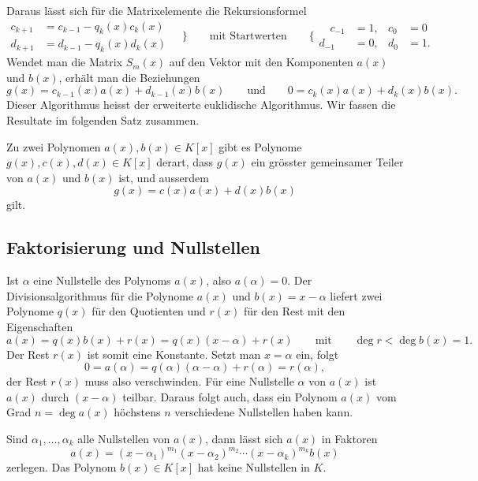 Daraus lässt sich für die Matrixelemente die Rekursionsformel
\[
\begin{aligned}
c_{k+1} &= c_{k-1} - q_k(x) c_k(x) \\
d_{k+1} &= d_{k-1} - q_k(x) d_k(x)
\end{aligned}
\quad
\bigg\}
\qquad
\text{mit Startwerten}
\qquad
\bigg\{
\begin{aligned}
\quad
c_{-1} &= 1, & c_0 &= 0 \\
d_{-1} &= 0, & d_0 &= 1.
\end{aligned}
\]
Wendet man die Matrix $S_m(x)$ auf den Vektor mit den Komponenten
$a(x)$ und $b(x)$, erhält man die Beziehungen
\[
g(x) = c_{k-1}(x) a(x) + d_{k-1}(x) b(x)
\qquad\text{und}\qquad
0 = c_k(x) a(x) + d_k(x) b(x).
\]
Dieser Algorithmus heisst der erweiterte euklidische Algorithmus.
Wir fassen die Resultate im folgenden Satz zusammen.

\begin{satz}
Zu zwei Polynomen $a(x),b(x) \in K[x]$ gibt es Polynome
$g(x),c(x),d(x)\in K[x]$
derart, dass $g(x)$ ein grösster gemeinsamer Teiler von $a(x)$ und $b(x)$
ist, und ausserdem
\[
g(x) = c(x)a(x)+d(x)b(x)
\]
gilt.
\end{satz}

%
%
\subsection{Faktorisierung und Nullstellen
\label{buch:polynome:subsection:faktorisierung-und-nullstellen}}
Ist $\alpha$ eine Nullstelle des Polynoms $a(x)$, also $a(\alpha)=0$.
Der Divisionsalgorithmus für die Polynome $a(x)$ und $b(x)=x-\alpha$
liefert zwei Polynome $q(x)$ für den Quotienten und $r(x)$ für den Rest
mit den Eigenschaften
\[
a(x)
=
q(x) b(x)
+r(x)
=
q(x)(x-\alpha)+r(x)
\qquad\text{mit}\qquad
\deg r < \deg b(x)=1.
\]
Der Rest $r(x)$ ist somit eine Konstante. 
Setzt man $x=\alpha$ ein, folgt
\[
0
=
a(\alpha)
=
q(\alpha)(\alpha-\alpha)+r(\alpha)
=
r(\alpha),
\]
der Rest $r(x)$ muss also verschwinden.
Für eine Nullstelle $\alpha$ von $a(x)$ ist $a(x)$ durch $(x-\alpha)$
teilbar.
Daraus folgt auch, dass ein Polynom $a(x)$ vom Grad $n=\deg a(x)$ höchstens
$n$ verschiedene Nullstellen haben kann.

Sind $\alpha_1,\dots,\alpha_k$ alle Nullstellen von $a(x)$, dann lässt
sich $a(x)$ in Faktoren
\[
a(x)
=
(x-\alpha_1)^{m_1}
(x-\alpha_2)^{m_2}
\cdots
(x-\alpha_k)^{m_k}
b(x)
\]
zerlegen.
Das Polynom $b(x)\in K[x]$ hat keine Nullstellen in $K$.


